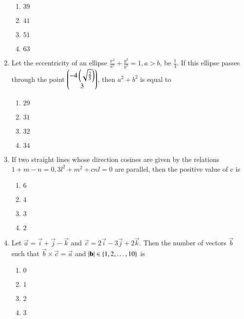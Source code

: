 \documentclass[journal,onecolumn]{IEEEtran}
\theoremstyle{remark}
\begin{document}
\begin{enumerate}
	\begin{enumerate}
		\item $39$ 
		\item $41$
		\item $51$
		\item $63$
	\end{enumerate}

    \item Let the eccentricity of an ellipse $\frac{x^2}{a^2} + \frac{y^2}{b^2} = 1, a > b$, be $\frac{1}{4}$. If this ellipse passes through the point $\begin{pmatrix}{-4\ensuremath{\left(\sqrt{\frac{2}{5}}\right)}}\\3\end{pmatrix}$, then $a^2 + b^2$ is equal to

	\begin{enumerate}
		\item $29$ 
		\item $31$
		\item $32$
		\item $34$
	\end{enumerate}


    \item If two straight lines whose direction cosines are given by the relations $1 + m - n = 0, 3l^2 + m^2 + cnl = 0$ are parallel, then the positive value of c is

	\begin{enumerate}
		\item $6$ 
		\item $4$
		\item $3$
		\item $2$
	\end{enumerate}

    \item Let $\vec{a} = \vec{i} + \vec{j} - \vec{k}$ and $\vec{c} = 2\vec{i} - 3\vec{j} + 2\vec{k}$. Then the number of vectors $\vec{b}$ such that $\vec{b} \times \vec{c} = \vec{a}$ and $\left\vert\mathbf{b}\right\vert \in \left\{1, 2, \dots, 10\right\}$ is

	\begin{enumerate}
		\item $0$ 
		\item $1$
		\item $2$
		\item $3$
	\end{enumerate}

\end{enumerate}
\end{document}
